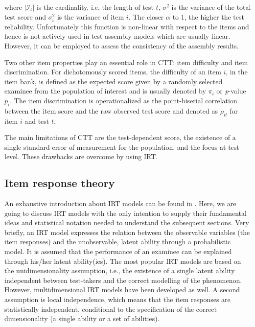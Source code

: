 \noindent where $|\mathcal{I}_t|$ is the cardinality, i.e. the length of test $t$, $\sigma^2$ is the variance of the total test score and $\sigma^2_i$ is the variance of item $i$. The closer $\alpha$ to 1, the higher the test reliability. Unfortunately this function is non-linear with respect to the items and hence is not actively used in test assembly models which are usually linear. However, it can be employed to assess the consistency of the assembly results.

Two other item properties play an essential role in CTT: item difficulty and item discrimination. For dichotomously scored items, the difficulty of an item  $i$, in the item bank, is defined as the expected score given by a randomly selected examinee from the population of interest and is usually denoted by $\pi_i$ or \textit{p}-value $p_i$. The item discrimination is operationalized as the point-biserial correlation between the item score and the raw observed test score and denoted as $\rho_{it}$ for item $i$ and test $t$.

The main limitations of CTT are the test-dependent score, the existence of a single standard error of measurement for the population, and the focus at test level. These drawbacks are overcome by using IRT.

\subsection{Item response theory}\label{sec:irt}
An exhaustive introduction about IRT models can be found in \textcite{lord1968statistical, Hamb91}. Here, we are going to discuss IRT models with the only intention to supply their fundamental ideas and statistical notation needed to understand the subsequent sections. Very briefly, an IRT model expresses the relation between the observable variables (the item responses) and the unobservable, latent ability through a probabilistic model. It is assumed that the performance of an examinee can be explained through his/her latent ability(ies). The most popular IRT models are based on the unidimensionality assumption, i.e., the existence of a single latent ability independent between test-takers and the correct modelling of the phenomenon. However, multidimensional IRT models have been developed as well. A second assumption is local independence, which means that the item responses are statistically independent, conditional to the specification of the correct dimensionality (a single ability or a set of abilities).

